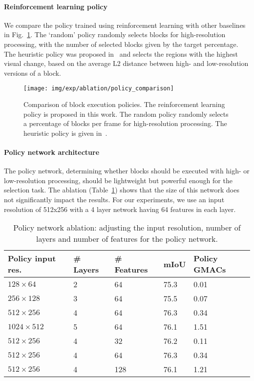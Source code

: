 \paragraph*{\textbf{Reinforcement learning policy}}
We compare the policy trained using reinforcement learning with other baselines in Fig.~\ref{fig:policy_ablation}. The `random' policy randomly selects blocks for high-resolution processing, with the number of selected blocks given by the target percentage. The heuristic policy was proposed in~\cite{verelst2020segblocks} and selects the regions with the highest visual change, based on the average L2 distance between high- and low-resolution versions of a block. 

\begin{figure}[tb]
\centering
\texttt{[image: img/exp/ablation/policy\_comparison]}
\caption{
{Comparison of block execution policies. The reinforcement learning policy is proposed in this work. The random policy randomly selects a percentage of blocks per frame for high-resolution processing. The heuristic policy is given in~\cite{verelst2020segblocks}. }
}
\label{fig:policy_ablation}
\end{figure}

\paragraph*{\textbf{Policy network architecture}}
The policy network, determining whether blocks should be executed with high- or low-resolution processing, should be lightweight but powerful enough for the selection task. The ablation (Table~\ref{tab:ablation_policynet}) shows that the size of this network does not significantly impact the results. For our experiments, we use an input resolution of 512x256 with a 4 layer network having 64 features in each layer.


\begin{table}[tb]
\scriptsize
\centering
\caption{Policy network ablation: adjusting the input resolution, number of layers and number of features for the policy network.}
\label{tab:ablation_policynet}
\begin{tabular}{@{}lllll@{}}
\toprule
\textbf{Policy input res.} & \textbf{\# Layers} & \textbf{\# Features} & \textbf{mIoU} & \textbf{Policy GMACs} \\ \midrule
$128{\times}64 $ & 2 & 64  & 75.3 & 0.01 \\
$256{\times}128$ & 3 & 64  & 75.5 & 0.07 \\
$512{\times}256$ & 4 & 64  & 76.3 & 0.34 \\
$1024{\times}512$ & 5 & 64  & 76.1 & 1.51 \\
\midrule

$512{\times}256$ & 4 & 32  & 76.2 & 0.11 \\
$512{\times}256$ & 4 & 64  & 76.3 & 0.34 \\
$512{\times}256$ & 4 & 128 & 76.1 & 1.21 \\ \bottomrule
\end{tabular}
\end{table}




